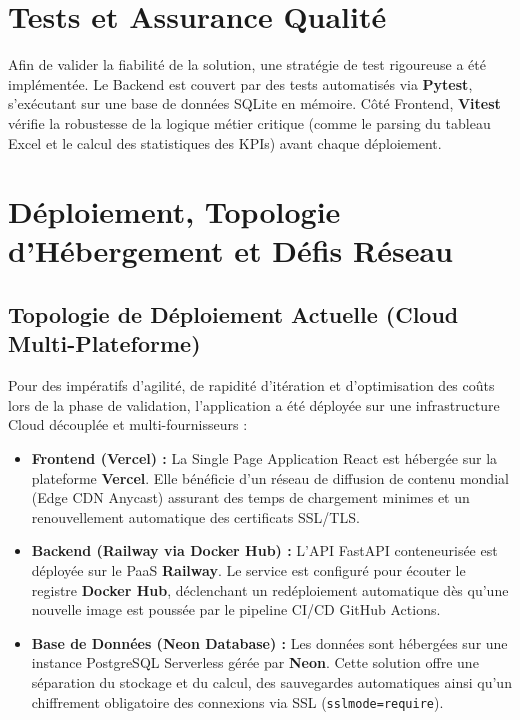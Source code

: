 \section{Tests et Assurance Qualité}
Afin de valider la fiabilité de la solution, une stratégie de test rigoureuse a été implémentée. Le Backend est couvert par des tests automatisés via \textbf{Pytest}, s'exécutant sur une base de données SQLite en mémoire. Côté Frontend, \textbf{Vitest} vérifie la robustesse de la logique métier critique (comme le parsing du tableau Excel et le calcul des statistiques des KPIs) avant chaque déploiement.

\section{Déploiement, Topologie d'Hébergement et Défis Réseau}
\label{sec:deploiement_infra}

\subsection{Topologie de Déploiement Actuelle (Cloud Multi-Plateforme)}
Pour des impératifs d'agilité, de rapidité d'itération et d'optimisation des coûts lors de la phase de validation, l'application a été déployée sur une infrastructure Cloud découplée et multi-fournisseurs :
\begin{itemize}
    \item \textbf{Frontend (Vercel) :} La Single Page Application React est hébergée sur la plateforme \textbf{Vercel}. Elle bénéficie d'un réseau de diffusion de contenu mondial (Edge CDN Anycast) assurant des temps de chargement minimes et un renouvellement automatique des certificats SSL/TLS.
    \item \textbf{Backend (Railway via Docker Hub) :} L'API FastAPI conteneurisée est déployée sur le PaaS \textbf{Railway}. Le service est configuré pour écouter le registre \textbf{Docker Hub}, déclenchant un redéploiement automatique dès qu'une nouvelle image est poussée par le pipeline CI/CD GitHub Actions.
    \item \textbf{Base de Données (Neon Database) :} Les données sont hébergées sur une instance PostgreSQL Serverless gérée par \textbf{Neon}. Cette solution offre une séparation du stockage et du calcul, des sauvegardes automatiques ainsi qu'un chiffrement obligatoire des connexions via SSL (\texttt{sslmode=require}).
\end{itemize}

